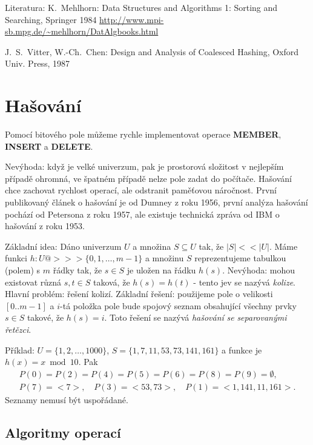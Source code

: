 \documentclass[a4paper,12pt]{article}
\begin{document}
Literatura:\newline 
K.~Mehlhorn: Data Structures and Algorithms 1: Sorting 
and Searching, Springer 1984\newline 
\url{http://www.mpi-sb.mpg.de/~mehlhorn/DatAlgbooks.html}

J.~S.~Vitter, W.-Ch.~Chen: Design and Analysis of 
Coalesced Hashing, Oxford Univ. Press, 1987

\section{Hašování}

Pomocí bitového pole můžeme rychle 
implementovat operace {\bf MEMBER}, {\bf INSERT} a {\bf DELETE}. 

Nevýhoda: když je velké univerzum, pak je prostorová 
složitost v nejlepším případě ohrom\-ná, ve špatném 
případě nelze pole zadat do počítače.\newline 
Hašování chce zachovat rychlost operací, ale odstranit 
paměťo\-vou náročnost. První publikovaný článek o 
hašování je od Dumney z roku 1956, první analýza hašování 
pochází od Petersona z roku 1957, ale existuje technická  
zpráva od IBM o hašování z roku 1953.

Základní idea: Dáno univerzum $U$ a množina 
$S\subseteq U$ tak, že $|S|<<|U|$. Máme funkci 
$h:U@>>>\{0,1,\dots,m-1\}$ a množinu $S$ reprezentujeme 
tabulkou (polem) s $m$ řádky tak, že $s\in S$ je uložen na 
řádku $h(s)$.\newline 
Nevýhoda: mohou existovat různá $s,t\in S$ taková, 
že $h(s)=h(t)$ - tento jev se nazývá \emph{kolize}.\newline 
Hlavní problém: řešení kolizí.\newline 
Základní řešení: použijeme pole o velikosti $[
0..m-1]$ a 
$i$-tá položka pole bude spojový seznam obsahující 
všechny prvky $s\in S$ takové, že $h(s)=i$. Toto řešení se 
nazývá \emph{hašování} \emph{se} \emph{separovanými} 
\emph{řetězci}.

Příklad: $U=\{1,2,\dots,1000\}$, $S=\{1,7,11,53,
73,141,161\}$ a 
funkce je $h(x)=x\bmod10$. Pak 
\begin{gather*} P(0)=P(2)=P(4)=P(5)=P(6)=P(8)=P(9)=\emptyset ,\\
P(7)=<7>,\quad P(3)=<53,73>,\quad P(1)=<1,141,11,161>.\end{gather*}
Seznamy nemusí být uspořádané.  

\subsection{
Algoritmy operací
}
\end{document}
